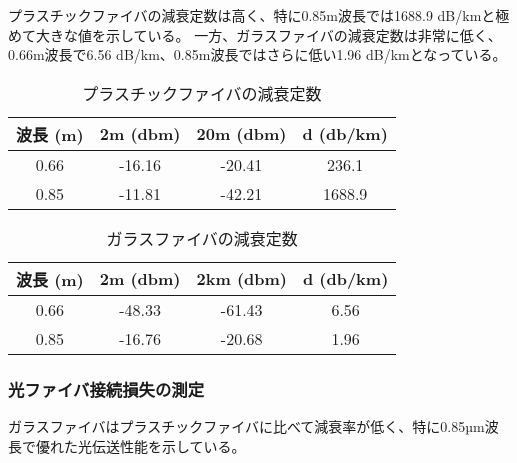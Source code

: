 \documentclass[a4paper,11pt,xelatex,ja=standard]{bxjsarticle}
\begin{document}
            プラスチックファイバの減衰定数は高く、特に0.85m波長では1688.9 dB/kmと極めて大きな値を示している。
            一方、ガラスファイバの減衰定数は非常に低く、0.66m波長で6.56 dB/km、0.85m波長ではさらに低い1.96 dB/kmとなっている。

            \begin{center}
                \begin{table}[H]
                    \caption{プラスチックファイバの減衰定数}
                    \centering
                    \begin{tabular}{|c|c|c|c|}
                        \hline
                        波長 (m) & 2m (dbm) & 20m (dbm) & d (db/km) \\
                        \hline
                        0.66 & -16.16 & -20.41 & 236.1 \\
                        \hline
                        0.85 & -11.81 & -42.21 & 1688.9 \\
                        \hline
                    \end{tabular}
                \end{table}
            \end{center}
        
            \begin{center}
                \begin{table}[H]
                    \caption{ガラスファイバの減衰定数}
                    \centering
                    \begin{tabular}{|c|c|c|c|}
                        \hline
                        波長 (m) & 2m (dbm) & 2km (dbm) & d (db/km) \\
                        \hline
                        0.66 & -48.33 & -61.43 & 6.56 \\
                        \hline
                        0.85 & -16.76 & -20.68 & 1.96 \\
                        \hline
                    \end{tabular}
                \end{table}
            \end{center}
        
        \subsubsection{光ファイバ接続損失の測定}

            ガラスファイバはプラスチックファイバに比べて減衰率が低く、特に0.85µm波長で優れた光伝送性能を示している。
\end{document}
